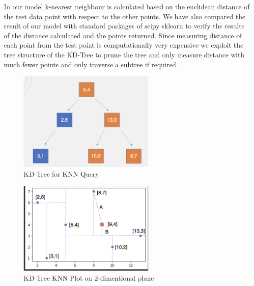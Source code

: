 In our model k-nearest neighbour is calculated based on the euclidean distance of the test data point with respect to the other points. We have also compared the result of our model with standard packages of scipy sklearn to verify the results of the distance calculated and the points returned. Since measuring distance of each point from the test point is computationally very expensive we exploit the tree structure of the KD-Tree to prune the tree and only measure distance with much fewer points and only traverse a subtree if required. \\

\begin{figure}[htp]
    \centering
    \includegraphics[width=0.6\textwidth]{graphs/KD-Tree_KNN_Tree.png}
    \caption{KD-Tree for KNN Query}
    \label{fig:KD-Tree_for_KNN Query}
\end{figure}

\begin{figure}[htp]
    \centering
    \includegraphics[width=0.6\textwidth]{graphs/KD-Tree_KNN_plot.png}
    \caption{KD-Tree KNN Plot on 2-dimentional plane}
    \label{fig:KD_Tree_KNN_Plot}
\end{figure}


